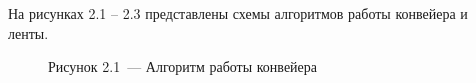 \documentclass[12pt, a4paper]{report}
\begin{document}
	На рисунках 2.1 -- 2.3 представлены схемы алгоритмов работы конвейера и ленты.
	
	\begin{figure}[H]
		\caption*{Рисунок 2.1~--- Алгоритм работы конвейера}
	\end{figure}
	
\end{document}
